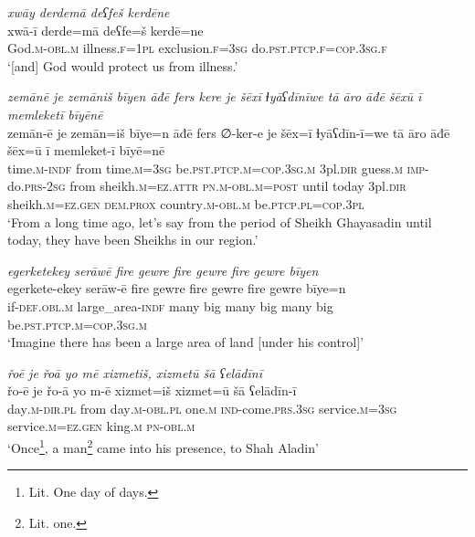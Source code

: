 \ea \label{DG.7}
\textit{xwāy derdemā deʕfeš kerdēne} \\ 
\gll xwā-ī derde=mā deʕfe=š kerdē=ne \\ 
 God\textsc{.m}\textsc{-obl}\textsc{.m} illness\textsc{\textsc{.f}}\textsc{=1pl} exclusion\textsc{\textsc{.f}}\textsc{=3sg} do\textsc{.pst}\textsc{.ptcp}\textsc{\textsc{.f}}\textsc{=cop}\textsc{.3sg}\textsc{\textsc{.f}} \\ 
\glt `[and] God would protect us from illness.'
\z 
 
\ea \label{DG.8}
\textit{zemānē je zemāniš bīyen āđē fers kere je šēxī ɫyāʕdīnīwe tā āro āđē šēxū ī memleketī bīyēnē} \\ 
\gll zemān-ē je zemān=iš bīye=n āđē fers ∅-ker-e je šēx=ī ɫyāʕdīn-ī=we tā āro āđē šēx=ū ī memleket-ī bīyē=nē \\ 
 time\textsc{.m}\textsc{-indf} from time\textsc{.m}\textsc{=3sg} be\textsc{.pst}\textsc{.ptcp}\textsc{.m}\textsc{=cop}\textsc{.3sg}\textsc{.m} 3pl\textsc{.dir} guess\textsc{.m} \textsc{imp-}do\textsc{.prs}-\textsc{2sg} from sheikh\textsc{.m}\textsc{=ez}.\textsc{attr} \textsc{pn}\textsc{.m}\textsc{-obl}\textsc{.m}\textsc{=\textsc{post}} until today 3pl\textsc{.dir} sheikh\textsc{.m}\textsc{=ez}\textsc{.gen} \textsc{dem.prox} country\textsc{.m}\textsc{-obl}\textsc{.m} be\textsc{.ptcp}\textsc{.pl}\textsc{=cop}\textsc{.3pl} \\ 
\glt `From a long time ago, let’s say from the period of Sheikh Ghayasadin until today, they have been Sheikhs in our region.'
\z 
 
\ea \label{DG.9}
\textit{egerketekey serāwē fire gewre fire gewre fire gewre bīyen} \\ 
\gll egerkete-ekey serāw-ē fire gewre fire gewre fire gewre bīye=n \\ 
 if\textsc{-def}\textsc{.obl}\textsc{.m} large\_area\textsc{-indf} many big many big many big be\textsc{.pst}\textsc{.ptcp}\textsc{.m}\textsc{=cop}\textsc{.3sg}\textsc{.m} \\ 
\glt `Imagine there has been a large area of land [under his control]'
\z 
 
\ea \label{DG.11}
\textit{řoē je řoā yo mē xizmetiš, xizmetū šā ʕelādīnī} \\ 
\gll řo-ē je řo-ā yo m-ē xizmet=iš xizmet=ū šā ʕelādīn-ī \\ 
 day\textsc{.m}\textsc{-dir}\textsc{.pl} from day\textsc{.m}\textsc{-obl}\textsc{.pl} one\textsc{.m} \textsc{ind-}come\textsc{.prs}\textsc{.3sg} service\textsc{.m}\textsc{=3sg} service\textsc{.m}\textsc{=ez}\textsc{.gen} king\textsc{.m} \textsc{pn}\textsc{-obl}\textsc{.m} \\ 
\glt `Once\footnote{Lit. One day of days.}, a man\footnote{Lit. one.}  came into his presence, to Shah Aladin'
\z 
 
